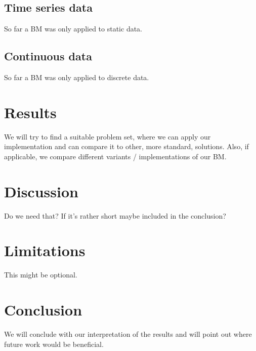 \documentclass[
	12pt,
	a4paper,
	BCOR10mm,
	DIV14,
	headsepline,
	usegeometry,
]{scrreprt}
\begin{document}
\section{Time series data}

So far a BM was only applied to static data.


\section{Continuous data}

So far a BM was only applied to discrete data.


\chapter{Results}

We will try to find a suitable problem set, where we can apply our implementation and can compare it to other, more standard, solutions. Also, if applicable, we compare different variants / implementations of our BM.


\chapter{Discussion}

Do we need that? If it's rather short maybe included in the conclusion?  %


\chapter{Limitations}

This might be optional. %


\chapter{Conclusion}

We will conclude with our interpretation of the results and will point out where future work would be beneficial.




\end{document}
